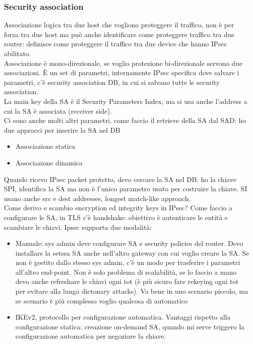 \documentclass[16px]{article}
\begin{document}
\subsubsection{Security association}
Associazione logica tra due host che vogliono proteggere il traffico, non è per forza tra due host ma può anche identificare come proteggere traffico tra due router: definisce come proteggere il traffico tra due device che hanno IPsec abilitato.\\ Associazione è mono-direzionale, se voglio protezione bi-direzionale servono due associazioni. È un set di parametri, internamente IPsec specifica dove salvare i parametri, c'è security association DB, in cui si salvano tutte le security association.\\ La main key della SA è il Security Parameters Index, ma si usa anche l'address a cui la SA è associata (receiver side).\\ Ci sono anche molti altri parametri, come faccio il retrieve della SA dal SAD: ho due approcci per inserire la SA nel DB
\begin{itemize}
\item Associazione statica
\item Associazione dinamica
\end{itemize}
Quando ricevo IPsec packet protetto, devo cercare la SA nel DB: ho la chiave SPI, identifica la SA ma non è l'unico parametro usato per costruire la chiave. SI usano anche src e dest addresses, longest match-like approach.\\ Come derivo e scambio encryption ed integrity keys in IPsec? Come faccio a configurare le SA, in TLS c'è handshake: obiettivo è autenticare le entità e scambiare le chiavi. Ipsec supporta due modalità:
\begin{itemize}
\item Manuale: sys admin deve configurare SA e security policies del router. Devo installare la setssa SA anche nell'altro gateway con cui voglio creare la SA. Se non è gestito dallo stesso sys admin, c'è un modo per trasferire i parametri all'altro end-point. Non è solo problema di scalabilità, se lo faccio a mano devo anche refreshare le chiavi ogni tot (è più sicuro fare rekeying ogni tot per evitare alla lunga dictonary attacks). Va bene in uno scenario piccolo, ma se scenario è più complesso voglio qualcosa di automatico
\item IKEv2, protocollo per configurazione automatica. Vantaggi rispetto alla configurazione statica: creazione on-demand SA, quando mi serve triggero la configurazione automatica per negoziare la chiave.
\end{itemize}
\end{document}
